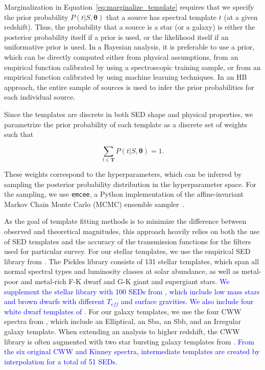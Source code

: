 \documentclass[useAMS,usenatbib]{mn2e}
\begin{document}
Marginalization in Equation~\ref{eq:marginalize_template}
requires that we specify the prior probability
$P \left(t | S, \mathbf{\theta} \right)$
that a source has spectral template $t$ (at a given redshift).
Thus, the probability that a source is a star (or a galaxy)
is either the posterior probability itself
if a prior is used,
or the likelihood itself if an uniformative prior is used.
In a Bayesian analysis, it is preferable to use a prior,
which can be directly computed either from physical assumptions,
from an empirical function calibrated by
using a spectroscopic training sample,
or from an empirical function calibrated by
using machine learning techniques.
In an HB approach, the entire sample of sources is used to
infer the prior probabilities for each individual source.

Since the templates are discrete in both SED shape and physical properties,
we parametrize the prior probability of each template
as a discrete set of weights such that

\begin{equation}
\sum_{t \in \mathbf{T}}
P \left(t | S, \mathbf{\theta} \right) = 1.
\end{equation}

\noindent
These weights correspond to the hyperparameters,
which can be inferred by sampling
the posterior probability distribution in the hyperparameter space.
For the sampling, we use \texttt{emcee}, a Python implementation of the
affine-invariant Markov Chain Monte Carlo (MCMC) ensemble sampler~\citep{Foreman-Mackey2013}.  

As the goal of template fitting methods is to minimize
the difference between observed and theoretical magnitudes,
this approach heavily relies on
both the use of SED templates and
the accuracy of the transmission functions
for the filters used for particular survey.
For our stellar templates,
we use the empirical SED library from \cite{pickles1998stellar}.
The Pickles library consists of 131 stellar templates,
which span all normal spectral types
and luminosity classes at solar abundance,
as well as metal-poor and metal-rich F-K dwarf 
and G-K giant and supergiant stars.
\textcolor{blue}{
We supplement the stellar library with
100 SEDs from \cite{chabrier2000evolutionary},
which include low mass stars and brown dwarfs
with different $T_{eff}$ and surface gravities.
We also include four white dwarf templates of
\cite{bohlin1995white}.
}
For our galaxy templates,
we use the four CWW spectra from \cite{coleman1980colors},
which include an Elliptical, an Sba, an Sbb,
and an Irregular galaxy template.
When extending an analysis to higher redshift,
the CWW library is often augmented with
two star bursting galaxy templates from \cite{kinney1996template}.
\textcolor{blue}{
From the six original CWW and Kinney spectra,
intermediate templates are created by interpolation
for a total of 51 SEDs.
}
\end{document}
